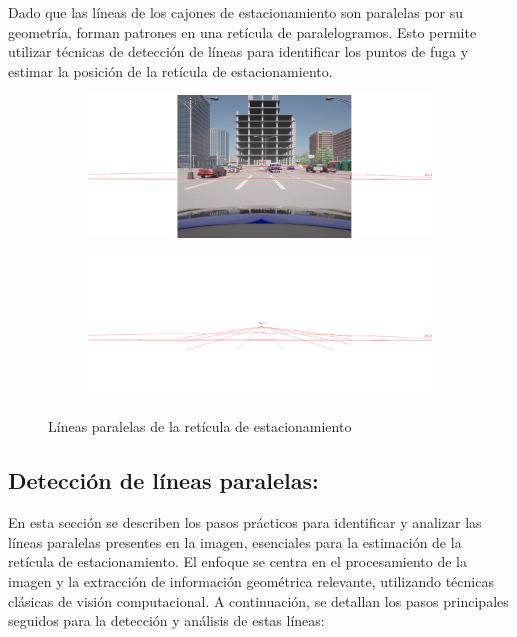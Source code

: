 \noindent
Dado que las líneas de los cajones de estacionamiento son paralelas por su geometría, forman patrones en una retícula de paralelogramos.
Esto permite utilizar técnicas de detección de líneas para identificar los puntos de fuga y estimar la posición de la retícula de estacionamiento.

\begin{figure}[!ht]
    \centering
    \begin{subfigure}{0.8\textwidth}
        \includegraphics[width=\textwidth]{img/reticule/pov_reticule}\label {fig:pov_reticule}
    \end{subfigure}
    \begin{subfigure}{0.8\textwidth}
        \includegraphics[width=\textwidth]{img/reticule/pov_reticule_layer}\label {fig:pov_reticule_layers}
    \end{subfigure}
    \caption{Líneas paralelas de la retícula de estacionamiento}
    \label{fig:reticule_pov}
\end{figure}



\subsection{Detección de líneas paralelas:}
\noindent
En esta sección se describen los pasos prácticos para identificar y analizar las líneas paralelas presentes en la imagen, 
esenciales para la estimación de la retícula de estacionamiento. 
El enfoque se centra en el procesamiento de la imagen y la extracción de información geométrica relevante, 
utilizando técnicas clásicas de visión computacional.
A continuación, se detallan los pasos principales seguidos para la detección y análisis de estas líneas:

